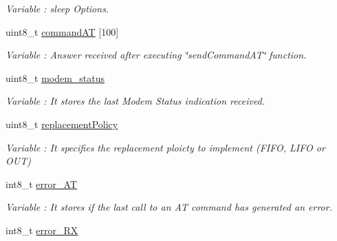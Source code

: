 \begin{DoxyCompactItemize}
\begin{DoxyCompactList}\small\item\em Variable \+: sleep Options. \end{DoxyCompactList}\item 
uint8\+\_\+t \hyperlink{class_wasp_x_bee_core_a2b8aa8d4939d9f04165a0fa98c5bd192}{command\+AT} \mbox{[}100\mbox{]}\hypertarget{class_wasp_x_bee_core_a2b8aa8d4939d9f04165a0fa98c5bd192}{}\label{class_wasp_x_bee_core_a2b8aa8d4939d9f04165a0fa98c5bd192}

\begin{DoxyCompactList}\small\item\em Variable \+: Answer received after executing \char`\"{}send\+Command\+A\+T\char`\"{} function. \end{DoxyCompactList}\item 
uint8\+\_\+t \hyperlink{class_wasp_x_bee_core_a84a93d1904f736fbf8eea8388412d34d}{modem\+\_\+status}\hypertarget{class_wasp_x_bee_core_a84a93d1904f736fbf8eea8388412d34d}{}\label{class_wasp_x_bee_core_a84a93d1904f736fbf8eea8388412d34d}

\begin{DoxyCompactList}\small\item\em Variable \+: It stores the last Modem Status indication received. \end{DoxyCompactList}\item 
uint8\+\_\+t \hyperlink{class_wasp_x_bee_core_af0ee374d2bcbe13e949ac31f1598311b}{replacement\+Policy}\hypertarget{class_wasp_x_bee_core_af0ee374d2bcbe13e949ac31f1598311b}{}\label{class_wasp_x_bee_core_af0ee374d2bcbe13e949ac31f1598311b}

\begin{DoxyCompactList}\small\item\em Variable \+: It specifies the replacement ploicty to implement (F\+I\+FO, L\+I\+FO or O\+UT) \end{DoxyCompactList}\item 
int8\+\_\+t \hyperlink{class_wasp_x_bee_core_a0084179d7f40bbbaf22274e0eb711367}{error\+\_\+\+AT}\hypertarget{class_wasp_x_bee_core_a0084179d7f40bbbaf22274e0eb711367}{}\label{class_wasp_x_bee_core_a0084179d7f40bbbaf22274e0eb711367}

\begin{DoxyCompactList}\small\item\em Variable \+: It stores if the last call to an AT command has generated an error. \end{DoxyCompactList}\item 
int8\+\_\+t \hyperlink{class_wasp_x_bee_core_a0ecfbe5f9caa7b8ebe3ccf507fb967ff}{error\+\_\+\+RX}\hypertarget{class_wasp_x_bee_core_a0ecfbe5f9caa7b8ebe3ccf507fb967ff}{}\label{class_wasp_x_bee_core_a0ecfbe5f9caa7b8ebe3ccf507fb967ff}


\end{DoxyCompactItemize}
